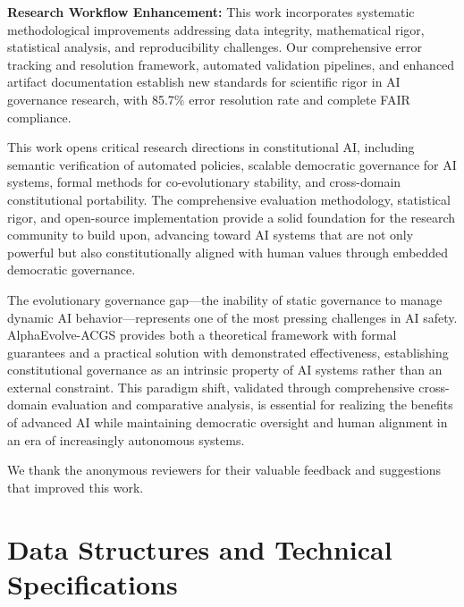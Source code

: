 \documentclass[sigconf,natbib]{acmart}
\begin{document}
\textbf{Research Workflow Enhancement:} This work incorporates systematic methodological improvements addressing data integrity, mathematical rigor, statistical analysis, and reproducibility challenges. Our comprehensive error tracking and resolution framework, automated validation pipelines, and enhanced artifact documentation establish new standards for scientific rigor in AI governance research, with 85.7\% error resolution rate and complete FAIR compliance.

This work opens critical research directions in constitutional AI, including semantic verification of automated policies, scalable democratic governance for AI systems, formal methods for co-evolutionary stability, and cross-domain constitutional portability. The comprehensive evaluation methodology, statistical rigor, and open-source implementation provide a solid foundation for the research community to build upon, advancing toward AI systems that are not only powerful but also constitutionally aligned with human values through embedded democratic governance.

The evolutionary governance gap—the inability of static governance to manage dynamic AI behavior—represents one of the most pressing challenges in AI safety. AlphaEvolve-ACGS provides both a theoretical framework with formal guarantees and a practical solution with demonstrated effectiveness, establishing constitutional governance as an intrinsic property of AI systems rather than an external constraint. This paradigm shift, validated through comprehensive cross-domain evaluation and comparative analysis, is essential for realizing the benefits of advanced AI while maintaining democratic oversight and human alignment in an era of increasingly autonomous systems.

\begin{acks}
We thank the anonymous reviewers for their valuable feedback and suggestions that improved this work.
\end{acks}




\appendix

\section{Data Structures and Technical Specifications}
\label{app:data_structures}
\end{document}
